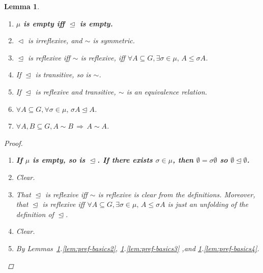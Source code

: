 \documentclass[11pt]{article}
\newcommand{\nouveau}[1]{{\small \color{blue} \bf  #1}}
\newtheorem{lemma}[definition]{Lemma}
\newcommand{\releq}{\mathrel{\trianglelefteq}}
\newcommand{\rel}{\mathrel{\triangleleft}}
\begin{document}
\begin{lemma}\label{lem:pref-basics}
\begin{enumerate}

\item\label{lem:pref-basics1} %
  \nouveau{ \(\mu\) is empty iff \(\releq\) is empty. }
 
 \item\label{lem:pref-basics2} $\rel$ is irreflexive, and $\sim$ is symmetric.

 \item\label{lem:pref-basics3} $\releq$ is reflexive iff $\sim$ is reflexive, iff $\forall A \subseteq G, \exists \sigma \in \mu,\, A \leq \sigma A$.
 
 \item\label{lem:pref-basics4} If $\releq$ is transitive, so is $\sim$.
 
 \item\label{lem:pref-basics5} If $\releq$ is reflexive and transitive, $\sim$ is an equivalence relation.
 
  \item\label{lem:pref-basics6} $\forall A \subseteq G, \forall \sigma \in \mu,\, \sigma A \releq A$.
  
    \item\label{lem:pref-basics7} $\forall A,B \subseteq G, A \sim B \,\Rightarrow\, A \sim A$.
\end{enumerate}

\begin{proof}
 \begin{enumerate}
 \item \nouveau{%
     If $\mu$ is empty, so is $\releq$.  If there exists
     \(\sigma \in \mu\), then \(\emptyset = \sigma \emptyset\) so
     \(\emptyset \unlhd \emptyset\). }
 
  \item Clear.
  
  \item That $\releq$ is reflexive iff $\sim$ is reflexive is clear from the definitions. Moreover, that $\releq$ is reflexive iff $\forall A \subseteq G, \exists \sigma \in \mu,\, A \leq \sigma A$ is just an unfolding of the definition of $\releq$.
  
  \item Clear.
  
  \item By Lemmas~\ref{lem:pref-basics}.\ref{lem:pref-basics2}, 
 \ref{lem:pref-basics}.\ref{lem:pref-basics3} ,and \ref{lem:pref-basics}.\ref{lem:pref-basics4}.
 

\end{enumerate}
\end{proof}
\end{lemma}
\end{document}
